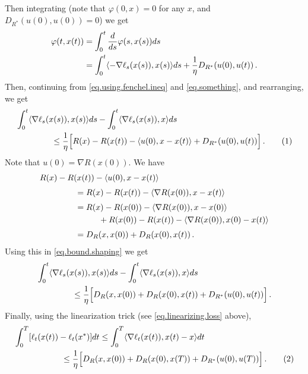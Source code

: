 \documentclass[12pt]{article}
\theoremstyle{plain}
\theoremstyle{definition}
\theoremstyle{remark}
\begin{document}
Then integrating
(note that $\varphi(0,x) = 0$ for any $x$, and $D_{R^{*}}(u(0), u(0)) = 0$) 
we get
\begin{align*}
\varphi(t,x(t)) 
&= \int_{0}^{t} \frac{d}{ds} \varphi(s,x(s)) ds \\
&= \int_{0}^{t} \langle {-\nabla\ell_{s}(x(s)), x(s)}\rangle ds 
     + \frac{1}{\eta} D_{R^{*}}(u(0), u(t)) \,.
\end{align*}
Then, continuing from \eqref{eq.using.fenchel.ineq} and \eqref{eq.something},
and rearranging, we get
\begin{align*}
&\int_{0}^{t} \ab{\nabla\ell_{s}(x(s)), x(s)} ds - \int_{0}^{t} \ab{\nabla\ell_{s}(x(s)), x} ds \\
&\hspace{1.5cm}
\leq \frac{1}{\eta} \Bigl[ R(x) - R(x(t)) - \ab{u(0), x - x(t)} + D_{R^{*}}(u(0), u(t)) \Bigr]\,.
\addtocounter{equation}{1}
\label{eq.bound.shaping}  \tag{\theequation}
\end{align*}
Note that $u(0) = \nabla R(x(0))$. We have
\begin{align*}
&R(x) - R(x(t)) - \langle {u(0), x - x(t)}\rangle \\[1mm]
&\hspace{1.5cm}
= R(x) - R(x(t)) - \langle {\nabla R(x(0)), x - x(t)}\rangle \\[1mm]
&\hspace{1.5cm}
= R(x) - R(x(0)) - \langle {\nabla R(x(0)), x - x(0)}\rangle \\
&\hspace{2.5cm}
   + R(x(0)) - R(x(t)) - \langle {\nabla R(x(0)), x(0) - x(t)}\rangle \\[1mm]
&\hspace{1.5cm}
= D_{R}(x,x(0)) + D_{R}(x(0),x(t))\,.
\end{align*}
Using this in \eqref{eq.bound.shaping} we get
\begin{align*}
&\int_{0}^{t} \langle {\nabla\ell_{s}(x(s)), x(s)}\rangle ds - \int_{0}^{t} \langle {\nabla\ell_{s}(x(s)), x}\rangle ds \\
&\hspace{1.5cm}
\leq \frac{1}{\eta} \Bigl[ D_{R}(x,x(0)) + D_{R}(x(0),x(t)) + D_{R^{*}}(u(0), u(t)) \Bigr]\,.
\end{align*}
Finally, using the linearization trick (see \eqref{eq.linearizing.loss} above),
\begin{align*}
&\int_{0}^{T} [\ell_{t}(x(t)) - \ell_{t}(x^{*})] dt
\leq \int_{0}^{T} \ab{\nabla\ell_{t}(x(t)), x(t) - x} dt \\
&\hspace{2.0cm}
\leq \frac{1}{\eta} \Bigl[ D_{R}(x,x(0)) + D_{R}(x(0),x(T)) + D_{R^{*}}(u(0), u(T)) \Bigr]\,.
\addtocounter{equation}{1}
\label{eq.bound.new}  \tag{\theequation}
\end{align*}
\end{document}

